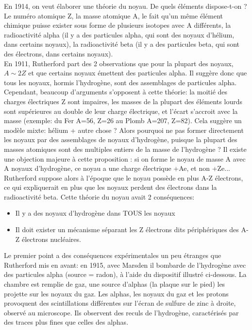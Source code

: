     En 1914, on veut élaborer une théorie du noyau. De quels éléments dispose-t-on ? Le numéro atomique Z, la masse atomique A, le fait qu'un même élément chimique puisse exister sous forme de plusieurs isotopes avec A différents, la radioactivité alpha (il y a des particules alpha, qui sont des noyaux d'hélium, dans certains noyaux), la radioactivité beta (il y a des particules beta, qui sont des électrons, dans certains noyaux). \\
    En 1911, Rutherford part des 2 observations que pour la plupart des noyaux, $A \sim 2Z$ et que certains noyaux émettent des particules alpha. Il suggère donc que tous les noyaux, hormis l'hydrogène, sont des assemblages de particules alpha. \\
    Cependant, beaucoup d'arguments s'opposent à cette théorie: la moitié des charges électriques Z sont impaires, les masses de la plupart des éléments lourds sont supérieures au double de leur charge électrique, et l'écart s'accroit avec la masse (exemple: du Fer A=56, Z=26 au Plomb A=207, Z=82).  Cela suggère un modèle mixte: hélium + autre chose ? Alors pourquoi ne pas former directement les noyaux par des assemblages de noyaux d'hydrogène, puisque la plupart des masses atomiques sont des multiples entiers de la masse de l'hydrogène ? Il existe une objection majeure à cette proposition : si on forme le noyau de masse A avec A noyaux d'hydrogène, ce noyau a une charge électrique +Ae, et non +Ze... Rutherford suppose alors à l'époque que le noyau possède en plus A-Z électrons, ce qui expliquerait en plus que les noyaux perdent des électrons dans la radioactivité beta. Cette théorie du noyau avait 2 conséquences: 
    
    \begin{itemize}
        \item Il y a des noyaux d'hydrogène dans TOUS les noyaux
        \item Il doit exister un mécanisme séparant les Z électrons dits périphériques des A-Z électrons nucléaires. 
    \end{itemize}
    
    Le premier point a des conséquences expérimentales un peu étranges que Rutherford mis en avant: en 1915, avec Marsden il bombarde de l'hydrogène avec des particules alpha (source = radon), à l'aide du dispositif illustré ci-dessous. La chambre est remplie de gaz, une source d’alphas (la plaque sur le pied) les projette sur les noyaux du gaz. Les alphas, les noyaux du gaz et les protons  provoquent des scintillations différentes sur l’écran de sulfure de zinc à droite, observé au microscope. Ils observent des reculs de l'hydrogène, caractérisés par des traces plus fines que celles des alphas. 
    
